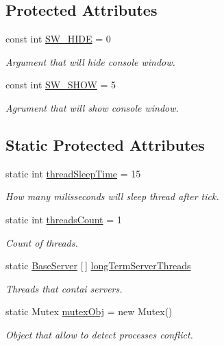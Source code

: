 \subsection*{Protected Attributes}
\begin{DoxyCompactItemize}
\item 
const int \mbox{\hyperlink{class_uniform_server_1_1_base_server_aaff91507b262d2a1b9021caa2d01640f}{S\+W\+\_\+\+H\+I\+DE}} = 0
\begin{DoxyCompactList}\small\item\em Argument that will hide console window. \end{DoxyCompactList}\item 
const int \mbox{\hyperlink{class_uniform_server_1_1_base_server_a494087cabc03c54c3dc0ac1cc1048860}{S\+W\+\_\+\+S\+H\+OW}} = 5
\begin{DoxyCompactList}\small\item\em Agrument that will show console window. \end{DoxyCompactList}\end{DoxyCompactItemize}
\subsection*{Static Protected Attributes}
\begin{DoxyCompactItemize}
\item 
static int \mbox{\hyperlink{class_uniform_server_1_1_base_server_a4dbe04636a763decfae22ddb2fe26c7a}{thread\+Sleep\+Time}} = 15
\begin{DoxyCompactList}\small\item\em How many milisseconds will sleep thread after tick. \end{DoxyCompactList}\item 
static int \mbox{\hyperlink{class_uniform_server_1_1_base_server_aa40c02a1eec7eda4c36a8ac08119b414}{threads\+Count}} = 1
\begin{DoxyCompactList}\small\item\em Count of threads. \end{DoxyCompactList}\item 
static \mbox{\hyperlink{class_uniform_server_1_1_base_server}{Base\+Server}} \mbox{[}$\,$\mbox{]} \mbox{\hyperlink{class_uniform_server_1_1_base_server_a9c14e919da0c2b9b7f8e57a92c9b0742}{long\+Term\+Server\+Threads}}
\begin{DoxyCompactList}\small\item\em Threads that contai servers. \end{DoxyCompactList}\item 
static Mutex \mbox{\hyperlink{class_uniform_server_1_1_base_server_a051bdce3aec037df76d8efe3b9938198}{mutex\+Obj}} = new Mutex()
\begin{DoxyCompactList}\small\item\em Object that allow to detect processes conflict. \end{DoxyCompactList}\end{DoxyCompactItemize}
